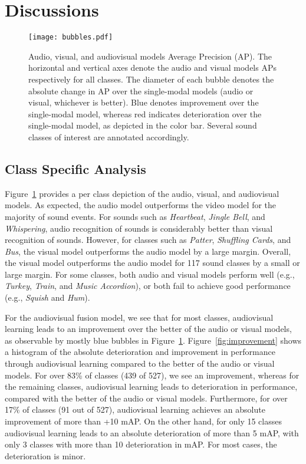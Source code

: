 \documentclass{article}
\begin{document}
\section{Discussions}\label{sec:discussion}

\begin{figure}[t]
	\centering
	\texttt{[image: bubbles.pdf]}
	\caption{Audio, visual, and audiovisual models Average Precision (AP). The horizontal and vertical axes denote the audio and visual models APs respectively for all classes. The diameter of each bubble denotes the absolute change in AP over the single-modal models (audio or visual, whichever is better). Blue denotes improvement over the single-modal model, whereas red indicates deterioration over the single-modal model, as depicted in the color bar. Several sound classes of interest are annotated accordingly.}\label{fig:classmap}
\end{figure}

\subsection{Class Specific Analysis}
Figure~\ref{fig:classmap} provides a per class depiction of the audio, visual, and audiovisual models.
As expected, the audio model outperforms the video model for the majority of sound events.
For sounds such as \emph{Heartbeat}, \emph{Jingle Bell}, and \emph{Whispering}, audio recognition of sounds is considerably better than visual recognition of sounds.
However, for classes such as \emph{Patter}, \emph{Shuffling Cards}, and \emph{Bus}, the visual model outperforms the audio model by a large margin.
Overall, the visual model outperforms the audio model for 117 sound classes by a small or large margin.
For some classes, both audio and visual models perform well (e.g., \emph{Turkey}, \emph{Train}, and \emph{Music Accordion}), or both fail to achieve good performance (e.g., \emph{Squish} and \emph{Hum}).

For the audiovisual fusion model, we see that for most classes, audiovisual learning leads to an improvement over the better of the audio or visual models, as observable by mostly blue bubbles in Figure~\ref{fig:classmap}.
Figure~\ref{fig:improvement} shows a histogram of the absolute deterioration and improvement in performance through audiovisual learning compared to the better of the audio or visual models.
For over 83\% of classes (439 of 527), we see an improvement, whereas for the remaining classes, audiovisual learning leads to deterioration in performance, compared with the better of the audio or visual models.
Furthermore, for over 17\% of classes (91 out of 527), audiovisual learning achieves an absolute improvement of more than +10 mAP.
On the other hand, for only 15 classes audiovisual learning leads to an absolute deterioration of more than 5 mAP, with only 3 classes with more than 10 deterioration in mAP.
For most cases, the deterioration is minor.
\end{document}
